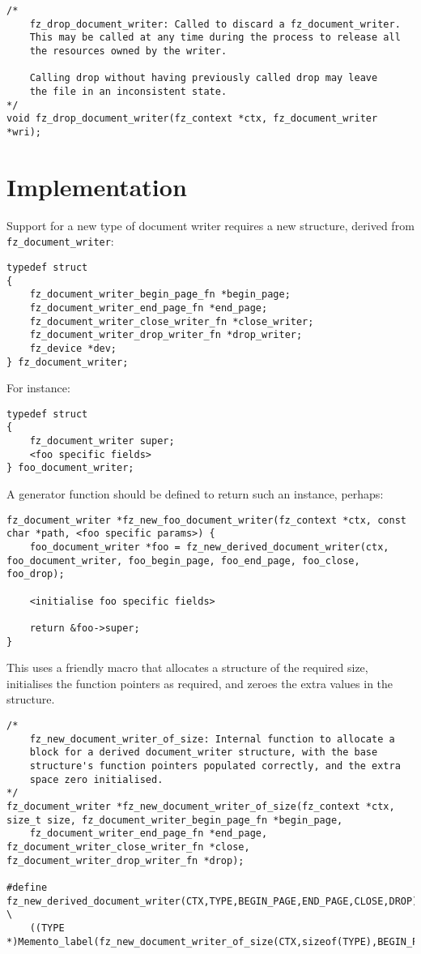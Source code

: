 \documentclass[oneside]{book}
\begin{document}
\begin{lstlisting}
/*
	fz_drop_document_writer: Called to discard a fz_document_writer.
	This may be called at any time during the process to release all
	the resources owned by the writer.

	Calling drop without having previously called drop may leave
	the file in an inconsistent state.
*/
void fz_drop_document_writer(fz_context *ctx, fz_document_writer *wri);
\end{lstlisting}

\section{Implementation}

Support for a new type of document writer requires a new structure, derived from \texttt{fz\_document\_writer}:

\begin{lstlisting}
typedef struct
{
	fz_document_writer_begin_page_fn *begin_page;
	fz_document_writer_end_page_fn *end_page;
	fz_document_writer_close_writer_fn *close_writer;
	fz_document_writer_drop_writer_fn *drop_writer;
	fz_device *dev;
} fz_document_writer;
\end{lstlisting}

For instance:

\begin{lstlisting}
typedef struct
{
	fz_document_writer super;
	<foo specific fields>
} foo_document_writer;
\end{lstlisting}

A generator function should be defined to return such an instance, perhaps:

\begin{lstlisting}
fz_document_writer *fz_new_foo_document_writer(fz_context *ctx, const char *path, <foo specific params>) {
    foo_document_writer *foo = fz_new_derived_document_writer(ctx, foo_document_writer, foo_begin_page, foo_end_page, foo_close, foo_drop);
    
    <initialise foo specific fields>
    
    return &foo->super;
}
\end{lstlisting}

This uses a friendly macro that allocates a structure of the required size, initialises the function pointers as required, and zeroes the extra values in the structure.

\begin{lstlisting}
/*
	fz_new_document_writer_of_size: Internal function to allocate a
	block for a derived document_writer structure, with the base
	structure's function pointers populated correctly, and the extra
	space zero initialised.
*/
fz_document_writer *fz_new_document_writer_of_size(fz_context *ctx, size_t size, fz_document_writer_begin_page_fn *begin_page,
	fz_document_writer_end_page_fn *end_page, fz_document_writer_close_writer_fn *close, fz_document_writer_drop_writer_fn *drop);

#define fz_new_derived_document_writer(CTX,TYPE,BEGIN_PAGE,END_PAGE,CLOSE,DROP) \
	((TYPE *)Memento_label(fz_new_document_writer_of_size(CTX,sizeof(TYPE),BEGIN_PAGE,END_PAGE,CLOSE,DROP),#TYPE))
\end{lstlisting}
\end{document}

